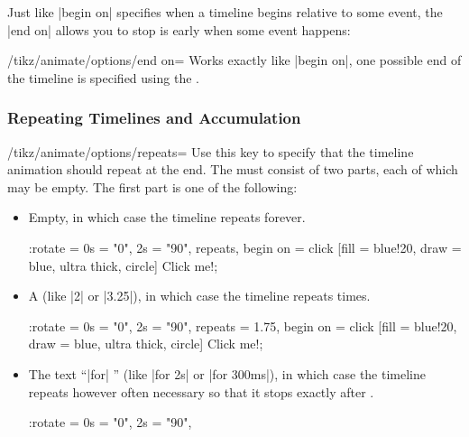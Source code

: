 Just like |begin on| specifies when a timeline begins relative to some event,
the |end on| allows you to stop is early when some event happens:

\begin{key}{/tikz/animate/options/end on=}
    Works exactly like |begin on|, one possible end of the timeline is
    specified using the .
\end{key}


\subsubsection{Repeating Timelines and Accumulation}

\begin{key}{/tikz/animate/options/repeats=}
    Use this key to specify that the timeline animation should repeat at the
    end. The  must consist of two parts, each of which may
    be empty. The first part is one of the following:
    \begin{itemize}
        \item Empty, in which case the timeline repeats forever.
\begin{codeexample}[
    preamble={\usetikzlibrary{animations}},
    animation list={1,2,3,4,5},
]
\tikz \node :rotate = { 0s = "0", 2s = "90",
                        repeats, begin on = click }
    [fill = blue!20, draw = blue, ultra thick, circle] {Click me!};
\end{codeexample}
        \item A  (like |2| or |3.25|), in which case the timeline
            repeats  times.
\begin{codeexample}[
    preamble={\usetikzlibrary{animations}},
    animation list={1,2,3,4,5},
]
\tikz \node :rotate = { 0s = "0", 2s = "90",
                        repeats = 1.75, begin on = click }
    [fill = blue!20, draw = blue, ultra thick, circle] {Click me!};
\end{codeexample}
        \item The text ``|for| '' (like |for 2s| or |for 300ms|), in
            which case the timeline repeats however often necessary so that it
            stops exactly after .
\begin{codeexample}[
    preamble={\usetikzlibrary{animations}},
    animation list={1,2,3,4,5},
]
\tikz \node :rotate = { 0s = "0", 2s = "90",
}
\end{codeexample}
\end{itemize}
\end{key}
